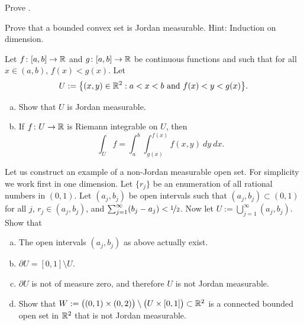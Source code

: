 \begin{exercise}
Prove .
\end{exercise}

\begin{exercise}
Prove that a bounded convex set is Jordan measurable.  Hint: Induction on
dimension.
\end{exercise}

\begin{samepage}
\begin{exercise} \label{exercise:intovertypeIset}
Let $f \colon [a,b] \to {\mathbb{R}}$ and
$g \colon [a,b] \to {\mathbb{R}}$ be continuous functions and such that
for all $x \in (a,b)$, $f(x) < g(x)$.  Let
\begin{equation*}
U := \bigl\{ (x,y) \in {\mathbb{R}}^2 : a < x < b \text{ and } f(x) < y < g(x) \bigr\} .
\end{equation*}
\begin{enumerate}[a)]
\item
Show that $U$ is Jordan measurable.
\item
If $f \colon U \to {\mathbb{R}}$ is Riemann integrable on $U$, then
\begin{equation*}
\int_U f =
\int_a^b \int_{g(x)}^{f(x)} f(x,y) ~ dy ~ dx .
\end{equation*}
\end{enumerate}
\end{exercise}
\end{samepage}

\begin{exercise}
Let us construct an example of a non-Jordan measurable open set.  For
simplicity we work first in one dimension.  Let $\{ r_j \}$ be an enumeration
of all rational numbers in $(0,1)$.  Let $(a_j,b_j)$ be open intervals
such that $(a_j,b_j) \subset (0,1)$ for all $j$, $r_j \in (a_j,b_j)$,
and $\sum_{j=1}^\infty (b_j-a_j) < \nicefrac{1}{2}$.  Now let $U :=
\bigcup_{j=1}^\infty (a_j,b_j)$.  Show that
\begin{enumerate}[a)]
\item
The open intervals $(a_j,b_j)$ as above actually exist.
\item
$\partial U = [0,1] \setminus U$.
\item
$\partial U$ is not of measure zero, and therefore $U$ is not Jordan measurable.
\item
Show that $W := \bigl( (0,1) \times (0,2) \bigr) \setminus \bigl( U
\times [0,1] \bigr) \subset {\mathbb{R}}^2$ is a connected bounded open set in ${\mathbb{R}}^2$
that is not Jordan measurable.
\end{enumerate}
\end{exercise}

